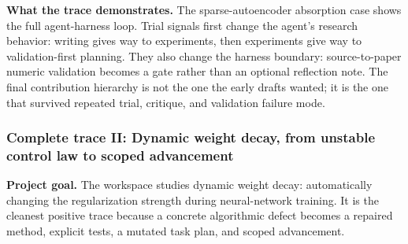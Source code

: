 \documentclass{article}
\begin{document}
\textbf{What the trace demonstrates.} The sparse-autoencoder absorption case shows the full agent-harness loop. Trial signals first change the agent's research behavior: writing gives way to experiments, then experiments give way to validation-first planning. They also change the harness boundary: source-to-paper numeric validation becomes a gate rather than an optional reflection note. The final contribution hierarchy is not the one the early drafts wanted; it is the one that survived repeated trial, critique, and validation failure mode.

\subsubsection{Complete trace II: Dynamic weight decay, from unstable control law to scoped advancement}

\textbf{Project goal.} The workspace studies dynamic weight decay: automatically changing the regularization strength during neural-network training. It is the cleanest positive trace because a concrete algorithmic defect becomes a repaired method, explicit tests, a mutated task plan, and scoped advancement.
\end{document}
